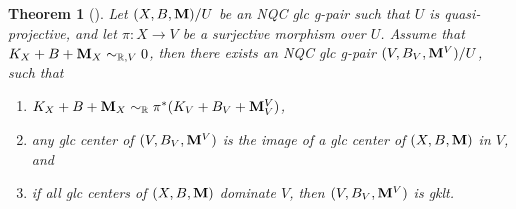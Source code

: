 \documentclass[11pt]{amsart}
\numberwithin{equation}{section}
\newcommand{\Mm}{{\bf{M}}}
\newtheorem{thm}{Theorem}[section]
\theoremstyle{definition}
\theoremstyle{definition}
\theoremstyle{definition}
\begin{document}
\begin{thm}[{\cite[Version 2, Theorem 5.1]{HL21}}]\label{thm: numerical generalized canonical bundle formula}
Let $(X,B,\Mm)/U$ be an NQC glc g-pair such that $U$ is quasi-projective, and let $\pi: X\rightarrow V$ be a surjective morphism over $U$. Assume that $K_X+B+\Mm_X\sim_{\mathbb R,V}0$, then there exists an NQC glc g-pair $(V,B_V,\Mm^V)/U$, such that
\begin{enumerate}
    \item  $K_X+B+\Mm_X\sim_{\mathbb R}\pi^*(K_V+B_V+\Mm^V_V)$,
    \item any glc center of $(V,B_V,\Mm^V)$ is the image of a glc center of $(X,B,\Mm)$ in $V$, and
    \item if all glc centers of $(X,B,\Mm)$ dominate $V$, then $(V,B_V,\Mm^V)$ is gklt. 
\end{enumerate}
\end{thm}
\end{document}
